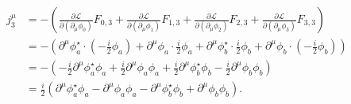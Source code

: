    \[
   \begin{aligned}
   j^\mu_3 &= -\left( \frac{\partial \mathcal{L}}{\partial (\partial_\mu \phi_0)} F_{0,3} + \frac{\partial \mathcal{L}}{\partial (\partial_\mu \phi_1)} F_{1,3} + \frac{\partial \mathcal{L}}{\partial (\partial_\mu \phi_2)} F_{2,3} + \frac{\partial \mathcal{L}}{\partial (\partial_\mu \phi_3)} F_{3,3} \right) \\
   &= -\left( \partial^\mu \phi_a^\star \cdot \left( -\frac{i}{2} \phi_a \right) + \partial^\mu \phi_a \cdot \frac{i}{2} \phi_a + \partial^\mu \phi_b^\star \cdot \frac{i}{2} \phi_b + \partial^\mu \phi_b \cdot \left( -\frac{i}{2} \phi_b \right) \right) \\
   &= -\left( -\frac{i}{2} \partial^\mu \phi_a^\star \phi_a + \frac{i}{2} \partial^\mu \phi_a \phi_a + \frac{i}{2} \partial^\mu \phi_b^\star \phi_b - \frac{i}{2} \partial^\mu \phi_b \phi_b \right) \\
   &= \frac{i}{2} \left( \partial^\mu \phi_a^\star \phi_a - \partial^\mu \phi_a \phi_a - \partial^\mu \phi_b^\star \phi_b + \partial^\mu \phi_b \phi_b \right).
   \end{aligned}
   \]

